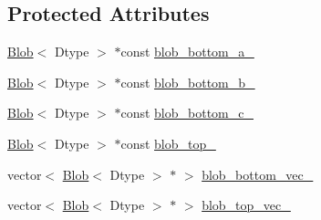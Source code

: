 \subsection*{Protected Attributes}
\begin{DoxyCompactItemize}
\item 
\hyperlink{classcaffe_1_1_blob}{Blob}$<$ Dtype $>$ $\ast$const \hyperlink{classcaffe_1_1_eltwise_product_layer_test_a99b6a7e85b88545e12bf33ad8d40256c}{blob\+\_\+bottom\+\_\+a\+\_\+}
\item 
\hyperlink{classcaffe_1_1_blob}{Blob}$<$ Dtype $>$ $\ast$const \hyperlink{classcaffe_1_1_eltwise_product_layer_test_a6f22183c4c7ca00ca9d37dd8b044ee33}{blob\+\_\+bottom\+\_\+b\+\_\+}
\item 
\hyperlink{classcaffe_1_1_blob}{Blob}$<$ Dtype $>$ $\ast$const \hyperlink{classcaffe_1_1_eltwise_product_layer_test_ae30c5e2a87e6f87aaca79fa495a5e598}{blob\+\_\+bottom\+\_\+c\+\_\+}
\item 
\hyperlink{classcaffe_1_1_blob}{Blob}$<$ Dtype $>$ $\ast$const \hyperlink{classcaffe_1_1_eltwise_product_layer_test_a3473d2cf8c1b5de2251a98177de1e50e}{blob\+\_\+top\+\_\+}
\item 
vector$<$ \hyperlink{classcaffe_1_1_blob}{Blob}$<$ Dtype $>$ $\ast$ $>$ \hyperlink{classcaffe_1_1_eltwise_product_layer_test_ad32b1991564800fa597cd39b3dd20f92}{blob\+\_\+bottom\+\_\+vec\+\_\+}
\item 
vector$<$ \hyperlink{classcaffe_1_1_blob}{Blob}$<$ Dtype $>$ $\ast$ $>$ \hyperlink{classcaffe_1_1_eltwise_product_layer_test_a59ea3d7e02db32dbfcb14cf068f4ebd8}{blob\+\_\+top\+\_\+vec\+\_\+}
\end{DoxyCompactItemize}


